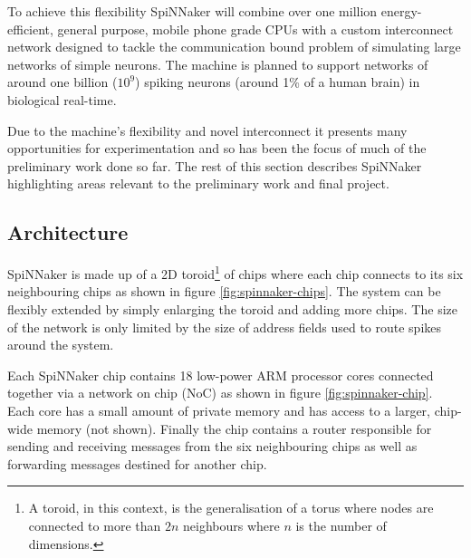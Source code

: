 		To achieve this flexibility SpiNNaker will combine over one million
		energy-efficient, general purpose, mobile phone grade CPUs with a custom
		interconnect network designed to tackle the communication bound problem of
		simulating large networks of simple neurons. The machine is planned to
		support networks of around one billion ($10^9$) spiking neurons (around 1\%
		of a human brain) in biological real-time.
		
		Due to the machine's flexibility and novel interconnect it presents many
		opportunities for experimentation and so has been the focus of much of the
		preliminary work done so far. The rest of this section describes SpiNNaker
		highlighting areas relevant to the preliminary work and final project.
		
		\subsection{Architecture}
			
			
			SpiNNaker is made up of a 2D toroid\footnote{A toroid, in this context, is
			the generalisation of a torus where nodes are connected to more than $2n$
			neighbours where $n$ is the number of dimensions.} of chips where each
			chip connects to its six neighbouring chips as shown in figure
			\ref{fig:spinnaker-chips}. The system can be flexibly extended by simply
			enlarging the toroid and adding more chips. The size of the network is
			only limited by the size of address fields used to route spikes around the
			system.
			
			Each SpiNNaker chip contains 18 low-power ARM processor cores connected
			together via a network on chip (NoC) as shown in figure
			\ref{fig:spinnaker-chip}. Each core has a small amount of private memory
			and has access to a larger, chip-wide memory (not shown). Finally the chip
			contains a router responsible for sending and receiving messages from the
			six neighbouring chips as well as forwarding messages destined for another
			chip.
			
			
